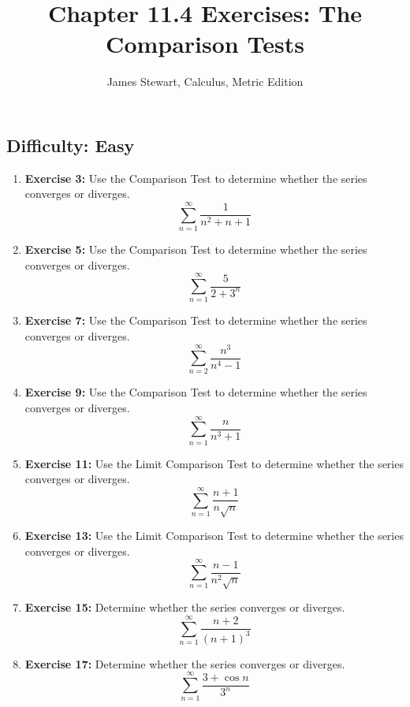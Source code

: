 \documentclass[12pt, a4paper]{article}
\title{Chapter 11.4 Exercises: The Comparison Tests}
\author{James Stewart, Calculus, Metric Edition}
\date{}
\begin{document}
\maketitle
\hrulefill
\vspace{1em}

\subsection*{Difficulty: Easy}
\begin{enumerate}
    \item \textbf{Exercise 3:} Use the Comparison Test to determine whether the series converges or diverges.
    \[ \sum_{n=1}^{\infty} \dfrac{1}{n^2 + n + 1} \]

    \item \textbf{Exercise 5:} Use the Comparison Test to determine whether the series converges or diverges.
    \[ \sum_{n=1}^{\infty} \dfrac{5}{2 + 3^n} \]

    \item \textbf{Exercise 7:} Use the Comparison Test to determine whether the series converges or diverges.
    \[ \sum_{n=2}^{\infty} \dfrac{n^3}{n^4 - 1} \]
    
    \item \textbf{Exercise 9:} Use the Comparison Test to determine whether the series converges or diverges.
    \[ \sum_{n=1}^{\infty} \dfrac{n}{n^3 + 1} \]

    \item \textbf{Exercise 11:} Use the Limit Comparison Test to determine whether the series converges or diverges.
    \[ \sum_{n=1}^{\infty} \dfrac{n+1}{n\sqrt{n}} \]

    \item \textbf{Exercise 13:} Use the Limit Comparison Test to determine whether the series converges or diverges.
    \[ \sum_{n=1}^{\infty} \dfrac{n-1}{n^2\sqrt{n}} \]
    
    \item \textbf{Exercise 15:} Determine whether the series converges or diverges.
    \[ \sum_{n=1}^{\infty} \dfrac{n+2}{(n+1)^3} \]
    
    \item \textbf{Exercise 17:} Determine whether the series converges or diverges.
    \[ \sum_{n=1}^{\infty} \dfrac{3 + \cos n}{3^n} \]
\end{enumerate}

\hrulefill
\vspace{1em}
\end{document}
